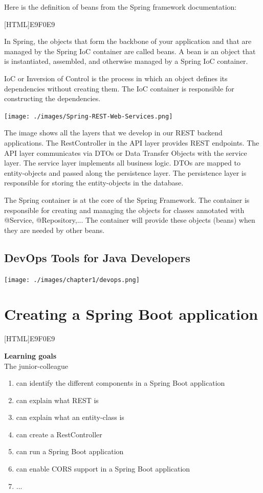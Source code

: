 \documentclass[a4paper, 12pt]{report}
\begin{document}
Here is the definition of beans from the Spring framework documentation:

[HTML]{E9F0E9}{\parbox{\textwidth}{%
\noindent In Spring, the objects that form the backbone of your application and that are managed by the Spring IoC container are called beans. A bean is an object that is instantiated, assembled, and otherwise managed by a Spring IoC container.}}

IoC or Inversion of Control is the process in which an object defines its dependencies without creating them. The IoC container is responsible for constructing the dependencies.

\texttt{[image: ./images/Spring-REST-Web-Services.png]} 

The image shows all the layers that we develop in our REST backend applications. The RestController in the API layer provides REST endpoints. The API layer communicates via DTOs or Data Transfer Objects with the service layer. The service layer implements all business logic. DTOs are mapped to entity-objects and passed along the persistence layer. The persistence layer is responsible for storing the entity-objects in the database.

The Spring container is at the core of the Spring Framework. The container is responsible for creating and managing the objects for classes annotated with @Service, @Repository,... The container will provide these objects (beans) when they are needed by other beans.


\section{DevOps Tools for Java Developers}

\texttt{[image: ./images/chapter1/devops.png]}  
 

\chapter{Creating a Spring Boot application}

[HTML]{E9F0E9}{\parbox{\textwidth}{%
\noindent \textbf{Learning goals}\\
The junior-colleague
\begin{enumerate}[nolistsep]
\item can identify the different components in a Spring Boot application
\item can explain what REST is
\item can explain what an entity-class is
\item can create a RestController
\item can run a Spring Boot application
\item can enable CORS support in a Spring Boot application
\item ...
\end{enumerate}}}
\end{document}
